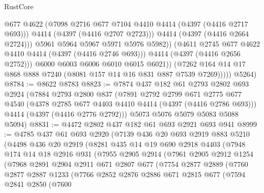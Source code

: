 \begin{lexlean}{RustCore}
\begin{coremodule}
                          @677
                          @4622
                          (@7098 @2716 @677 @7104 @4410 @4414 (@4397 (@4416 @2717 @693)))
                          @4414
                          (@4397 (@4416 @2707 @2723)))
                        @4414
                        (@4397 (@4416 @2664 @2724)))
                      @5961
                      @5964
                      @5967
                      @5971
                      @5976
                      @5982))
                  (@4611 @2745 @677 @4622 @4410 @4414 (@4397 (@4416 @2746 @693)))
                  @4414
                  (@4397 (@4416 @2656 @2752)))
                @6000
                @6003
                @6006
                @6010
                @6015
                @6021))
            (@7262 @164 @14 @17 @868 @888 @7240 (@8081 @157 @14 @16 @831 @887 @7539 @7269)))))
      @5264)
@8784 := @8622 @8783
@8823 := @7874
    @437
    @182
    @61
    @2793
    @2802
    @693
    @2924
    (@7884
      @2793
      @2800
      @837
      (@7891
        @2792
        @2799
        @671
        @2775
        @677
        @4540
        (@4378 @2785 @677 @4403 @4410 @4414 (@4397 (@4416 @2786 @693)))
        @4414
        (@4397 (@4416 @2776 @2792)))
      @5073
      @5076
      @5079
      @5083
      @5088
      @5094)
@8831 := @4472 @2802 @437 @182 @61 @693 @2921 @693 @941
@8999 := @4785
    @437
    @61
    @693
    @2920
    (@7139
      @436
      @20
      @693
      @2919
      @883
      @5210
      (@4498
        @436
        @20
        @2919
        (@8281
          @435
          @14
          @19
          @690
          @2918
          @4403
          (@7948
            @174
            @14
            @18
            @2916
            @931
            (@7955
              @2905
              @2914
              (@7961
                @2905
                @2912
                @1254
                (@7968
                  @2891
                  @2904
                  @2911
                  @671
                  @2807
                  @677
                  (@7754
                    @2877
                    @2889
                    (@7760
                      @2877
                      @2887
                      @1233
                      (@7766
                        @2852
                        @2876
                        @2886
                        @671
                        @2815
                        @677
                        (@7594
                          @2841
                          @2850
                          (@7600

\end{coremodule}
\end{lexlean}
